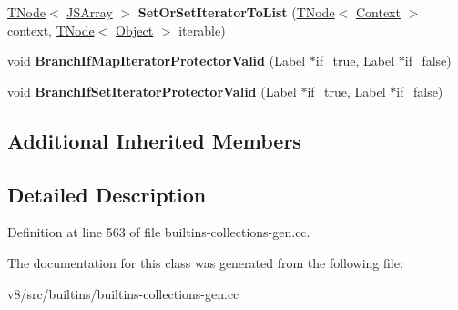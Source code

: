 \begin{DoxyCompactItemize}
\item 
\mbox{\label{classv8_1_1internal_1_1CollectionsBuiltinsAssembler_a0fa6b21b13d8e99e0feb880b5d8b6481}} 
\mbox{\hyperlink{classv8_1_1internal_1_1compiler_1_1TNode}{T\+Node}}$<$ \mbox{\hyperlink{classv8_1_1internal_1_1JSArray}{J\+S\+Array}} $>$ {\bfseries Set\+Or\+Set\+Iterator\+To\+List} (\mbox{\hyperlink{classv8_1_1internal_1_1compiler_1_1TNode}{T\+Node}}$<$ \mbox{\hyperlink{classv8_1_1internal_1_1Context}{Context}} $>$ context, \mbox{\hyperlink{classv8_1_1internal_1_1compiler_1_1TNode}{T\+Node}}$<$ \mbox{\hyperlink{classv8_1_1internal_1_1Object}{Object}} $>$ iterable)
\item 
\mbox{\label{classv8_1_1internal_1_1CollectionsBuiltinsAssembler_a80c7c811c602ddc46fc3d74c1499df17}} 
void {\bfseries Branch\+If\+Map\+Iterator\+Protector\+Valid} (\mbox{\hyperlink{classv8_1_1internal_1_1compiler_1_1CodeAssemblerLabel}{Label}} $\ast$if\+\_\+true, \mbox{\hyperlink{classv8_1_1internal_1_1compiler_1_1CodeAssemblerLabel}{Label}} $\ast$if\+\_\+false)
\item 
\mbox{\label{classv8_1_1internal_1_1CollectionsBuiltinsAssembler_a02e4849cba10a9551c915cd69cb4aeaf}} 
void {\bfseries Branch\+If\+Set\+Iterator\+Protector\+Valid} (\mbox{\hyperlink{classv8_1_1internal_1_1compiler_1_1CodeAssemblerLabel}{Label}} $\ast$if\+\_\+true, \mbox{\hyperlink{classv8_1_1internal_1_1compiler_1_1CodeAssemblerLabel}{Label}} $\ast$if\+\_\+false)
\end{DoxyCompactItemize}
\subsection*{Additional Inherited Members}


\subsection{Detailed Description}


Definition at line 563 of file builtins-\/collections-\/gen.\+cc.



The documentation for this class was generated from the following file\+:\begin{DoxyCompactItemize}
\item 
v8/src/builtins/builtins-\/collections-\/gen.\+cc\end{DoxyCompactItemize}
